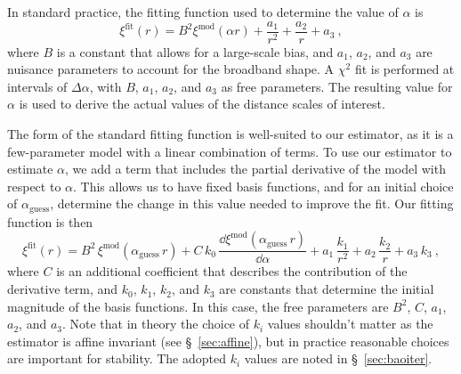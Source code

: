 In standard practice, the fitting function used to determine the value of $\alpha$ is 
\begin{equation}
\xi^{\mathrm{fit}}(r) = B^2 \xi^{\mathrm{mod}}(\alpha r) + \frac{a_1}{r^2} + \frac{a_2}{r} + a_3 ~,
\end{equation}
where $B$ is a constant that allows for a large-scale bias, and $a_1$, $a_2$, and $a_3$ are nuisance parameters to account for the broadband shape.
A $\chi^2$ fit is performed at intervals of $\Delta \alpha$, with $B$, $a_1$, $a_2$, and $a_3$ as free parameters. 
The resulting value for $\alpha$ is used to derive the actual values of the distance scales of interest.

The form of the standard fitting function is well-suited to our estimator, as it is a few-parameter model with a linear combination of terms.
To use our estimator to estimate $\alpha$, we add a term that includes the partial derivative of the model with respect to $\alpha$.
This allows us to have fixed basis functions, and for an initial choice of $\alpha_\mathrm{guess}$, determine the change in this value needed to improve the fit. 
Our fitting function is then
\begin{equation} \label{eq:baoiter_fit}
\xi^\mathrm{fit}(r) = B^2\,\xi^\mathrm{mod}(\alpha_\mathrm{guess}\,r) + C\,k_0\,\frac{\dd \xi^\mathrm{mod}(\alpha_\mathrm{guess}\,r)}{\dd \alpha} + a_1\,\frac{k_1}{r^2} + a_2\,\frac{k_2}{r} + a_3\,k_3 ~,
\end{equation}
where $C$ is an additional coefficient that describes the contribution of the derivative term, and $k_0$, $k_1$, $k_2$, and $k_3$ are constants that determine the initial magnitude of the basis functions.
In this case, the free parameters are $B^2$, $C$, $a_1$, $a_2$, and $a_3$.
Note that in theory the choice of $k_i$ values shouldn't matter as the estimator is affine invariant (see \S~\ref{sec:affine}), but in practice reasonable choices are important for stability.
The adopted $k_i$ values are noted in \S~\ref{sec:baoiter}.

